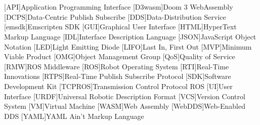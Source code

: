 \chapter*{}



\section*{}
\begin{acronym}[LONGEST]

    [API]{Application Programming Interface}
    [D3wasm]{Doom 3 WebAssembly}
    [DCPS]{Data-Centric Publish Subscribe}
    [DDS]{Data-Distribution Service}
    [emsdk]{Emscripten SDK}
    [GUI]{Graphical User Interface}
    [HTML]{HyperText Markup Language}
    [IDL]{Interface Description Language}
    [JSON]{JavaScript Object Notation}
    [LED]{Light Emitting Diode}
    [LIFO]{Last In, First Out}
    [MVP]{Minimum Viable Product}
    [OMG]{Object Management Group}
    [QoS]{Quality of Service}
    [RMW]{ROS Middleware}
    [ROS]{Robot Operating System}
    [RTI]{Real-Time Innovations}
    [RTPS]{Real-Time Publish Subscribe Protocol}
    [SDK]{Software Development Kit}
    [TCPROS]{Transmission Control Protocol ROS}
    [UI]{User Interface}
    [URDF]{Universal Robotic Description Format}
    [VCS]{Version Control System}
    [VM]{Virtual Machine}
    [WASM]{Web Assembly}
    [WebDDS]{Web-Enabled DDS}
    [YAML]{YAML Ain't Markup Language}

\end{acronym}


